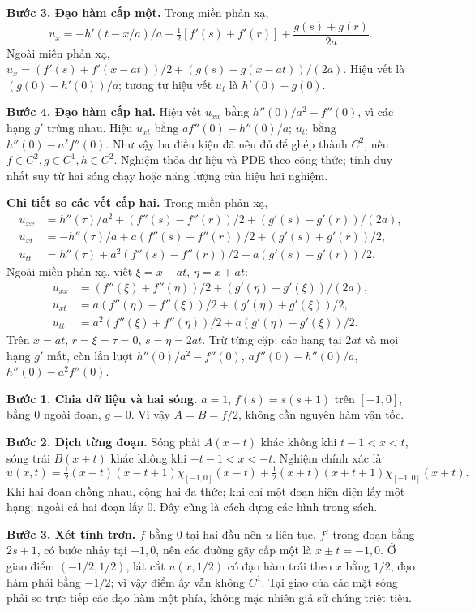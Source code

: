 \textbf{Bước 3. Đạo hàm cấp một.} Trong miền phản xạ,
\[u_x=-h'(t-x/a)/a+\tfrac12[f'(s)+f'(r)]+\frac{g(s)+g(r)}{2a}.\]
Ngoài miền phản xạ, $u_x=(f'(s)+f'(x-at))/2+(g(s)-g(x-at))/(2a)$. Hiệu vết là $(g(0)-h'(0))/a$; tương tự hiệu vết $u_t$ là $h'(0)-g(0)$.

\textbf{Bước 4. Đạo hàm cấp hai.} Hiệu vết $u_{xx}$ bằng $h''(0)/a^2-f''(0)$, vì các hạng $g'$ trùng nhau. Hiệu $u_{xt}$ bằng $af''(0)-h''(0)/a$; $u_{tt}$ bằng $h''(0)-a^2f''(0)$. Như vậy ba điều kiện đã nêu đủ để ghép thành $C^2$, nếu $f\in C^2,g\in C^1,h\in C^2$. Nghiệm thỏa dữ liệu và PDE theo công thức; tính duy nhất suy từ hai sóng chạy hoặc năng lượng của hiệu hai nghiệm.

\textbf{Chi tiết so các vết cấp hai.} Trong miền phản xạ,
\[\begin{aligned}
u_{xx}&=h''(\tau)/a^2+(f''(s)-f''(r))/2+(g'(s)-g'(r))/(2a),\\
u_{xt}&=-h''(\tau)/a+a(f''(s)+f''(r))/2+(g'(s)+g'(r))/2,\\
u_{tt}&=h''(\tau)+a^2(f''(s)-f''(r))/2+a(g'(s)-g'(r))/2.
\end{aligned}\]
Ngoài miền phản xạ, viết $\xi=x-at$, $\eta=x+at$:
\[\begin{aligned}
u_{xx}&=(f''(\xi)+f''(\eta))/2+(g'(\eta)-g'(\xi))/(2a),\\
u_{xt}&=a(f''(\eta)-f''(\xi))/2+(g'(\eta)+g'(\xi))/2,\\
u_{tt}&=a^2(f''(\xi)+f''(\eta))/2+a(g'(\eta)-g'(\xi))/2.
\end{aligned}\]
Trên $x=at$, $r=\xi=\tau=0$, $s=\eta=2at$. Trừ từng cặp: các hạng tại $2at$ và mọi hạng $g'$ mất, còn lần lượt $h''(0)/a^2-f''(0)$, $af''(0)-h''(0)/a$, $h''(0)-a^2f''(0)$.

\textbf{Bước 1. Chia dữ liệu và hai sóng.} $a=1$, $f(s)=s(s+1)$ trên $[-1,0]$, bằng $0$ ngoài đoạn, $g=0$. Vì vậy $A=B=f/2$, không cần nguyên hàm vận tốc.

\textbf{Bước 2. Dịch từng đoạn.} Sóng phải $A(x-t)$ khác không khi $t-1<x<t$, sóng trái $B(x+t)$ khác không khi $-t-1<x<-t$. Nghiệm chính xác là
\[u(x,t)=\tfrac12(x-t)(x-t+1)\chi_{[-1,0]}(x-t)+\tfrac12(x+t)(x+t+1)\chi_{[-1,0]}(x+t).\]
Khi hai đoạn chồng nhau, cộng hai đa thức; khi chỉ một đoạn hiện diện lấy một hạng; ngoài cả hai đoạn lấy $0$. Đây cũng là cách dựng các hình trong sách.

\textbf{Bước 3. Xét tính trơn.} $f$ bằng $0$ tại hai đầu nên $u$ liên tục. $f'$ trong đoạn bằng $2s+1$, có bước nhảy tại $-1,0$, nên các đường gãy cấp một là $x\pm t=-1,0$. Ở giao điểm $(-1/2,1/2)$, lát cắt $u(x,1/2)$ có đạo hàm trái theo $x$ bằng $1/2$, đạo hàm phải bằng $-1/2$; vì vậy điểm ấy vẫn không $C^1$. Tại giao của các mặt sóng phải so trực tiếp các đạo hàm một phía, không mặc nhiên giả sử chúng triệt tiêu.

